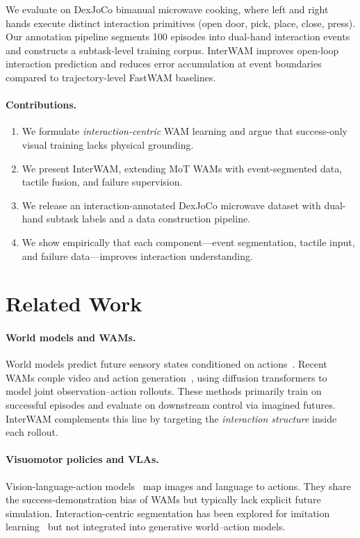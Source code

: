 \documentclass{article}
\begin{document}
We evaluate on DexJoCo bimanual microwave cooking, where left and right hands execute distinct interaction primitives (open door, pick, place, close, press).
Our annotation pipeline segments 100 episodes into dual-hand interaction events and constructs a subtask-level training corpus.
InterWAM improves open-loop interaction prediction and reduces error accumulation at event boundaries compared to trajectory-level FastWAM baselines.

\paragraph{Contributions.}
\begin{enumerate}
    \item We formulate \emph{interaction-centric} WAM learning and argue that success-only visual training lacks physical grounding.
    \item We present InterWAM, extending MoT WAMs with event-segmented data, tactile fusion, and failure supervision.
    \item We release an interaction-annotated DexJoCo microwave dataset with dual-hand subtask labels and a data construction pipeline.
    \item We show empirically that each component---event segmentation, tactile input, and failure data---improves interaction understanding.
\end{enumerate}

\section{Related Work}
\label{sec:related}

\paragraph{World models and WAMs.}
World models predict future sensory states conditioned on actions~\citep{ha2018world,hafner2023dreamer}.
Recent WAMs couple video and action generation~\citep{fastwam2026,cosmos2025,genie2024}, using diffusion transformers to model joint observation--action rollouts.
These methods primarily train on successful episodes and evaluate on downstream control via imagined futures.
InterWAM complements this line by targeting the \emph{interaction structure} inside each rollout.

\paragraph{Visuomotor policies and VLAs.}
Vision-language-action models~\citep{rt22023,openvla2024} map images and language to actions.
They share the success-demonstration bias of WAMs but typically lack explicit future simulation.
Interaction-centric segmentation has been explored for imitation learning~\citep{sharma2021dexterous} but not integrated into generative world--action models.
\end{document}
